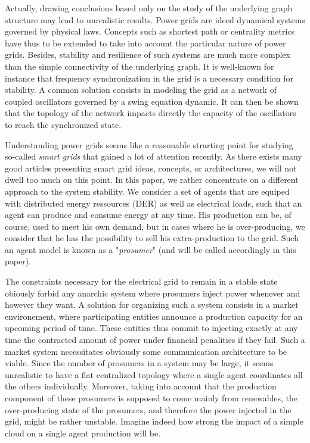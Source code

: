 \documentclass[conference]{IEEEtran}
\begin{document}
Actually, drawing conclusions based only on the study of the underlying graph structure may lead to unrealistic results. Power grids are ideed dynamical systems governed by physical laws. Concepts such as shortest path or centrality metrics have thus to be extended to take into account the particular nature of power grids. Besides, stability and resilience of such systems are much more complex than the simple connectivity of the underlying graph. It is well-known for instance that frequency synchronization in the grid is a necessary condition for stability. A common solution consists in modeling the grid as a network of coupled oscillators governed by a swing equation dynamic. It can then be shown that the topology of the network impacts directly the capacity of the oscillators to reach the synchronized state.

Understanding power grids seems like a reasonable strarting point for studying so-called \textit{smart grids} that gained a lot of attention recently. As there exists many good articles presenting smart grid ideas, concepts, or architectures, we will not dwell too much on this point. In this paper, we rather concentrate on a different approach to the system stability. We consider a set of agents that are equiped with distributed energy ressources (DER) as well as electrical loads, such that an agent can produce and consume energy at any time. His production can be, of course, used to meet his own demand, but in cases where he is over-producing, we consider that he has the possibility to sell his extra-production to the grid. Such an agent model is known as a "\textit{prosumer}" (and will be called accordingly in this paper). 

The constraints necessary for the electrical grid to remain in a stable state obiously forbid any anarchic system where prosumers inject power whenever and however they want. A solution for organizing such a system consists in a market environement, where participating entities announce a production capacity for an upcoming period of time. These entities thus commit to injecting exactly at any time the contracted amount of power under financial penalities if they fail. Such a market system necessitates obviously some communication architecture to be viable. Since the number of prosumers in a system may be large, it seems unrealistic to have a flat centralized topology where a single agent coordinates all the others individually. Moreover, taking into account that the production component of these prosumers is supposed to come mainly from renewables, the over-producing state of the prosumers, and therefore the power injected in the grid, might be rather unstable. Imagine indeed how strong the impact of a simple cloud on a single agent production will be. 
\end{document}
